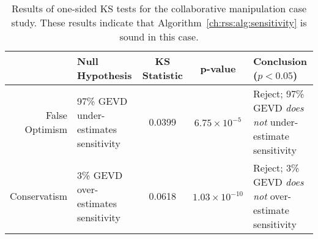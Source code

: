 \begin{table*}[thb]
    \renewcommand{\arraystretch}{1.5}
    \centering
    \begin{tabular}{r||p{4cm}|c|c|p{5cm}}
                     & Null Hypothesis                     & \shortstack{KS                                                                                       \\ Statistic} & p-value              & Conclusion ($p < 0.05$)                                        \\ \hline\hline
        \shortstack{False                                                                                                                                         \\Optimism} & 97\% GEVD under-estimates sensitivity & 0.0399         & $6.75\times10^{-5}$  & Reject; 97\% GEVD \textit{does not} under-estimate sensitivity \\ \hline
        Conservatism & 3\% GEVD over-estimates sensitivity & 0.0618         & $1.03\times10^{-10}$ & Reject; 3\% GEVD \textit{does not} over-estimate sensitivity
    \end{tabular}
    \caption{Results of one-sided KS tests for the collaborative manipulation case study. These results indicate that Algorithm~\ref{ch:rss:alg:sensitivity} is sound in this case.}\label{ch:rss:tab:ks_test_mam}
\end{table*}